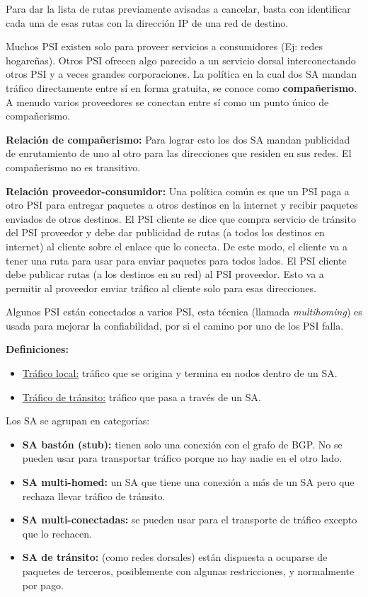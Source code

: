 	\par Para dar la lista de rutas previamente avisadas a cancelar, basta con identificar cada una de esas rutas con la dirección IP de una red de destino.
	
	\par Muchos PSI existen solo para proveer servicios a consumidores (Ej: redes 
	hogareñas). Otros PSI ofrecen algo parecido a un servicio dorsal interconectando 
	otros PSI y a veces grandes corporaciones. La política en la cual dos SA mandan tráfico directamente entre sí en forma gratuita, se conoce como \textbf{compañerismo}. A menudo varios proveedores se conectan entre sí como un punto único de compañerismo.
	
	\par \textbf{Relación de compañerismo:} Para lograr esto los dos SA mandan publicidad de enrutamiento de uno al otro para las direcciones que residen en sus redes. El compañerismo no es transitivo.
	
	\par \textbf{Relación proveedor-consumidor:} Una política común es que un PSI paga a otro PSI para entregar paquetes a otros destinos en la internet y recibir paquetes enviados de otros destinos. El PSI cliente se dice que compra servicio de tránsito del PSI proveedor y debe dar publicidad de rutas (a todos los destinos en internet) al cliente sobre el enlace que lo conecta. De este modo, el cliente va a tener una ruta para usar para enviar paquetes para todos lados. El PSI cliente debe publicar rutas (a los destinos en su red) al PSI proveedor. Esto va a permitir al proveedor enviar tráfico al cliente solo para esas direcciones.

	\par Algunos PSI están conectados a varios PSI, esta técnica (llamada \textit{multihoming}) es usada para mejorar la confiabilidad, por si el camino por uno de los PSI falla.

	\par \textbf{Definiciones:}
	\begin{itemize}
		\item \underline{Tráfico local:} tráfico que se origina y termina en nodos dentro de un SA. 		
		\item \underline{Tráfico de tránsito:} tráfico que pasa a través de un SA.
	\end{itemize}

	\par Los SA se agrupan en categorías:
	\begin{itemize}
		\item \textbf{SA bastón (stub):} tienen solo una conexión con el grafo de BGP. No se pueden usar para transportar tráfico porque no hay nadie en el otro lado.
		\item \textbf{SA multi-homed:} un SA que tiene una conexión a más de un SA pero que rechaza llevar tráfico de tránsito.
		\item \textbf{SA multi-conectadas:} se pueden usar para el transporte de tráfico excepto que lo rechacen.
		\item \textbf{SA de tránsito:} (como redes dorsales) están dispuesta a ocuparse de paquetes de terceros, posiblemente con algunas restricciones, y normalmente por pago.
	\end{itemize}
